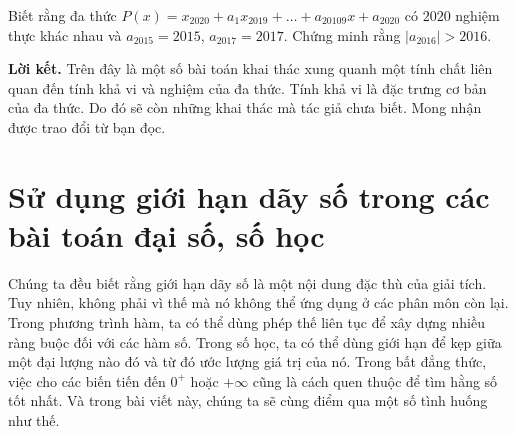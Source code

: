 \begin{bt}%
	Biết rằng đa thức $P(x)=x_{2020}+a_1x_{2019}+\ldots+a_{20109}x+a_{2020}$ có $2020$ nghiệm thực khác nhau và $a_2015=2015$, $a_{2017}=2017$. Chứng minh rằng $\left| a_{2016}\right|>2016$.	
\end{bt}
{\bf Lời kết.} Trên đây là một số bài toán khai thác xung quanh một tính chất liên quan đến tính khả vi và nghiệm của đa thức. Tính khả vi là đặc trưng cơ bản của đa thức. Do đó sẽ còn những khai thác mà tác giả chưa biết. Mong nhận được trao đổi từ bạn đọc.



\section{Sử dụng giới hạn dãy số trong các bài toán đại số, số học}
\begin{center}
	\textbf{\color{violet}{Lê Phúc Lữ\\
			Thân tặng các học sinh chuẩn bị tham gia kỳ thi VMO 2017}}
\end{center}

Chúng ta đều biết rằng giới hạn dãy số là một nội dung đặc thù của giải tích. Tuy nhiên, không phải vì thế mà nó không thể ứng dụng ở các phân môn còn lại. Trong phương trình hàm, ta có thể dùng phép thế liên tục để xây dựng nhiều ràng buộc đối với các hàm số. Trong số học, ta có thể dùng giới hạn để kẹp giữa một đại lượng nào đó và từ đó ước lượng giá trị của nó. Trong bất đẳng thức, việc cho các biến tiến đến $0^+$ hoặc $+\infty$ cũng là cách quen thuộc để tìm hằng số tốt nhất. Và trong bài viết này, chúng ta sẽ cùng điểm qua một số tình huống như thế.

